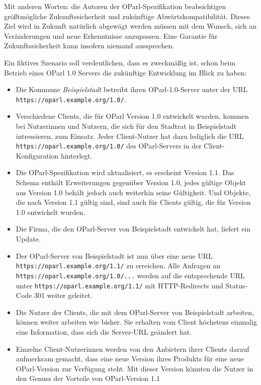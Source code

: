 \documentclass[,a4paper]{article}
\begin{document}
Mit anderen Worten: die Autoren der OParl-Spezifikation beabsichtigen
größtmögliche Zukunftssicherheit und zukünftige Abwärtskompatibilität.
Dieses Ziel wird in Zukunft natürlich abgewägt werden müssen mit dem
Wunsch, sich an Veränderungen und neue Erkenntnisse anzupassen. Eine
Garantie für Zukunftssicherheit kann insofern niemand aussprechen.

Ein fiktives Szenario soll verdeutlichen, dass es zweckmäßig ist, schon
beim Betrieb eines OParl 1.0 Servers die zukünftige Entwicklung im Blick
zu haben:

\begin{itemize}
\item
  Die Kommune \emph{Beispielstadt} betreibt ihren OParl-1.0-Server unter
  der URL \texttt{https://oparl.example.org/1.0/}.
\item
  Verschiedene Clients, die für OParl Version 1.0 entwickelt wurden,
  kommen bei Nutzerinnen und Nutzern, die sich für den Stadtrat in
  Beispielstadt intressieren, zum Einsatz. Jeder Client-Nutzer hat dazu
  lediglich die URL \texttt{https://oparl.example.org/1.0/} des
  OParl-Servers in der Client-Konfiguration hinterlegt.
\item
  Die OParl-Spezifikation wird aktualisiert, es erscheint Version 1.1.
  Das Schema enthält Erweiterungen gegenüber Version 1.0, jedes gültige
  Objekt aus Version 1.0 behält jedoch auch weiterhin seine Gültigkeit.
  Und Objekte, die nach Version 1.1 gültig sind, sind auch für Clients
  gültig, die für Version 1.0 entwickelt wurden.
\item
  Die Firma, die den OParl-Server von Beispielstadt entwickelt hat,
  liefert ein Update.
\item
  Der OParl-Server von Beispielstadt ist nun über eine neue URL
  \texttt{https://oparl.example.org/1.1/} zu erreichen. Alle Anfragen an
  \texttt{https://oparl.example.org/1.0/...} werden auf die
  entsprechende URL unter \texttt{https://oparl.example.org/1.1/} mit
  HTTP-Redirects und Status-Code 301 weiter geleitet.
\item
  Die Nutzer der Clients, die mit dem OParl-Server von Beispielstadt
  arbeiten, können weiter arbeiten wie bisher. Sie erhalten vom Client
  höchstens einmalig eine Information, dass sich die Server-URL geändert
  hat.
\item
  Einzelne Client-Nutzerinnen werden von den Anbietern ihrer Clients
  darauf aufmerksam gemacht, dass eine neue Version ihres Produkts für
  eine neue OParl-Version zur Verfügung steht. Mit dieser Version
  könnten die Nutzer in den Genuss der Vorteile von OParl-Version 1.1

\end{itemize}
\end{document}
